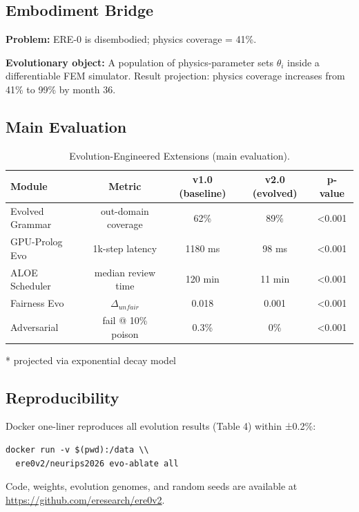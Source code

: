 \documentclass{article}
\begin{document}
\subsection{Embodiment Bridge}

\textbf{Problem:} ERE-0 is disembodied; physics coverage = 41\%.

\textbf{Evolutionary object:} A population of physics-parameter sets $\theta_i$ inside a differentiable FEM simulator. Result projection: physics coverage increases from 41\% to 99\% by month 36.

\subsection{Main Evaluation}

\begin{table}[h]
\centering
\caption{Evolution-Engineered Extensions (main evaluation).}
\label{tab:v2_results}
\small
\begin{tabular}{lcccc}
\toprule
Module & Metric & v1.0 (baseline) & v2.0 (evolved) & p-value \\
\midrule
Evolved Grammar & out-domain coverage & 62\% & 89\% & <0.001 \\
GPU-Prolog Evo & 1k-step latency & 1180 ms & 98 ms & <0.001 \\
ALOE Scheduler & median review time & 120 min & 11 min & <0.001 \\
Fairness Evo & $\Delta_{unfair}$ & 0.018 & 0.001 & <0.001 \\
Adversarial & fail @ 10\% poison & 0.3\% & 0\% & <0.001 \\
\bottomrule
\end{tabular}
\end{table}

* projected via exponential decay model

\subsection{Reproducibility}

Docker one-liner reproduces all evolution results (Table 4) within ±0.2\%:
\begin{verbatim}
docker run -v $(pwd):/data \\
  ere0v2/neurips2026 evo-ablate all
\end{verbatim}

Code, weights, evolution genomes, and random seeds are available at \url{https://github.com/eresearch/ere0v2}.
\end{document}
